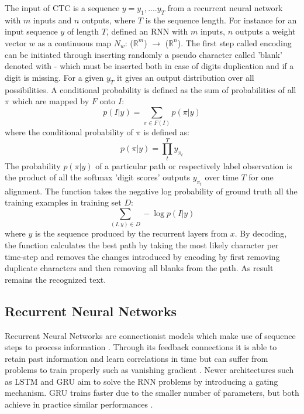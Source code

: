 The input of CTC is
a sequence $y=y_{1},....y_{T}$ from a recurrent neural network with $m$ inputs
and $n$ outputs, where $T$ is the sequence length. For instance for an input
sequence $y$ of length $T$, defined an RNN with $m$ inputs, $n$ outputs a
weight vector $w$ as a continuous map $N_w$: ($\mathbb{R}^m$) $\rightarrow$
($\mathbb{R}^n$). The first step called encoding can be initiated through
inserting randomly a pseudo character called 'blank' denoted with {-} which must
be inserted both in case of digits duplication and if a digit is missing. For a
given $y_{T}$ it gives an output distribution over all possibilities. A
conditional probability is defined as the sum of probabilities of all $\pi$
which are mapped by $F$ onto $I$:
\begin{equation}
p( I | y)=\sum_{\pi \in F(I)} p( \pi | y )
\label{eq1}
\end{equation}
where the conditional probability of $\pi$ is defined as: 
\begin{equation}
p( \pi | y ) =\prod_t^T y_{\pi_{t}}
\label{eq2}
\end{equation}
The probability $p( \pi | y )$ of a particular path or respectively label
observation is the product of all the softmax 'digit scores' outputs $y_{\pi_{t}}$
over time $T$ for one alignment. The function takes the negative log probability
of ground truth all the training examples in training set $D$:
\begin{equation}
\sum_{(I,y) \in D} - \log  p( I | y )
\label{eq3}
\end{equation}
where $y$ is the sequence produced by the recurrent layers from $x$. By
decoding, the function calculates the best path by taking the most likely
character per time-step and removes the changes introduced by encoding by first
removing duplicate characters and then removing all blanks from the path. As
result remains the recognized text.

\subsection{Recurrent Neural Networks}\label{subsec:rnn}
Recurrent Neural Networks are connectionist models which make use of
sequence steps to process information \cite{RNN}. Through its feedback
connections it is able to retain past information and learn correlations in time
but can suffer from problems to train properly such as vanishing gradient
\cite{vanishing_gradient}. Newer architectures such as LSTM \cite{LSTM}
and GRU \cite{GRU} aim to solve the RNN problems by introducing a gating
mechanism. GRU trains faster due to the smaller number of parameters, but both
achieve in practice similar performances \cite{LSTMvsGRU}. 
